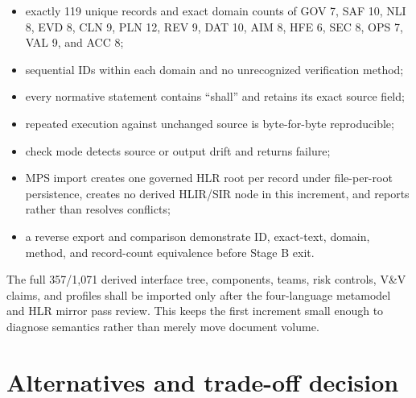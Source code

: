 \documentclass[11pt,letterpaper]{article}
\begin{document}
\begin{itemize}
\item exactly 119 unique records and exact domain counts of GOV 7, SAF 10, NLI 8, EVD 8, CLN 9, PLN 12, REV 9, DAT 10, AIM 8, HFE 6, SEC 8, OPS 7, VAL 9, and ACC 8;
\item sequential IDs within each domain and no unrecognized verification method;
\item every normative statement contains ``shall'' and retains its exact source field;
\item repeated execution against unchanged source is byte-for-byte reproducible;
\item check mode detects source or output drift and returns failure;
\item MPS import creates one governed HLR root per record under file-per-root persistence, creates no derived HLIR/SIR node in this increment, and reports rather than resolves conflicts;
\item a reverse export and comparison demonstrate ID, exact-text, domain, method, and record-count equivalence before Stage B exit.
\end{itemize}

The full 357/1,071 derived interface tree, components, teams, risk controls, V\&V claims, and profiles shall be imported only after the four-language metamodel and HLR mirror pass review. This keeps the first increment small enough to diagnose semantics rather than merely move document volume.

\section{Alternatives and trade-off decision}
\end{document}
